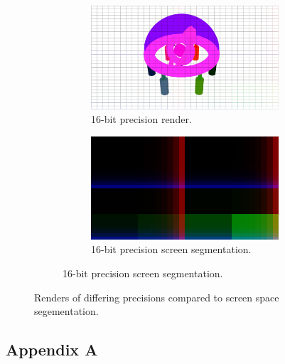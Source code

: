\documentclass[conference]{IEEEtran}
\begin{document}
\begin{figure}[htbp]
\begin{subfigure}{1.1\textwidth}
\begin{center}
\begin{minipage}[t]{\linewidth}
\hspace{-0.09\linewidth}
  \centering
    \begin{subfigure}{.49\textwidth}
      \centering
      \includegraphics[width=\linewidth]{16_render_cropped.jpg}
      \caption{16-bit precision render.}
      \label{fig:render_8}
    \end{subfigure}
    \begin{subfigure}{.49\textwidth}
      \centering
      \includegraphics[width=\linewidth]{16_partition_cropped.jpg}
      \caption{16-bit precision screen segmentation.}
      \label{fig:render_8}
    \end{subfigure}
  \label{fig:render_16}
\end{minipage}
\end{center}
\end{subfigure}
\caption{Renders of differing precisions compared to screen space segementation.}
\label{fig:render_comparisons}
\end{figure}

\begin{center}
\section*{Appendix A}
\label{app:a}
\end{center}
\end{document}
